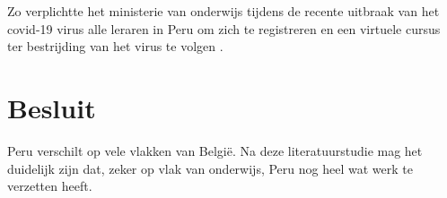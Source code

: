 Zo verplichtte het ministerie van onderwijs tijdens de recente uitbraak van het covid-19 virus alle leraren in Peru om zich te registreren en een virtuele cursus ter bestrijding van het virus te volgen \autocite{Educacion2020}.

\section{Besluit}
Peru verschilt op vele vlakken van België. Na deze literatuurstudie mag het duidelijk zijn dat, zeker op vlak van onderwijs, Peru nog heel wat werk te verzetten heeft.


